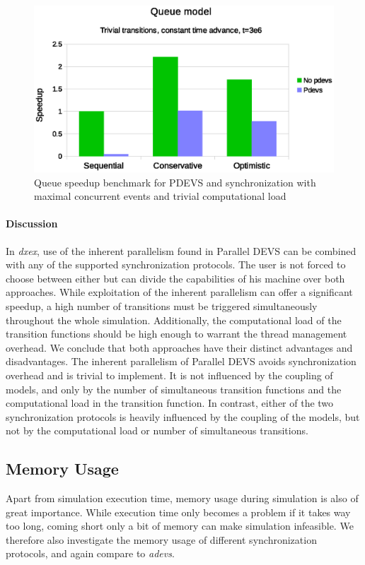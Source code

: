 \begin{figure}
	\center
	\includegraphics[width=\columnwidth]{fig/pdevs_no_sleep.eps}
	\caption{Queue speedup benchmark for PDEVS and synchronization with maximal concurrent events and trivial computational load}
	\label{fig:pdevs_plot_no_sleep}
\end{figure}

\paragraph{Discussion}
In \textit{dxex}, use of the inherent parallelism found in \textsf{Parallel DEVS} can be combined with any of the supported synchronization protocols.
The user is not forced to choose between either but can divide the capabilities of his machine over both approaches.
While exploitation of the inherent parallelism can offer a significant speedup, a high number of transitions must be triggered simultaneously throughout the whole simulation.
Additionally, the computational load of the transition functions should be high enough to warrant the thread management overhead.
We conclude that both approaches have their distinct advantages and disadvantages.
The inherent parallelism of \textsf{Parallel DEVS} avoids synchronization overhead and is trivial to implement.
It is not influenced by the coupling of models, and only by the number of simultaneous transition functions and the computational load in the transition function.
In contrast, either of the two synchronization protocols is heavily influenced by the coupling of the models, but not by the computational load or number of simultaneous transitions.

\subsection{Memory Usage}
Apart from simulation execution time, memory usage during simulation is also of great importance.
While execution time only becomes a problem if it takes way too long, coming short only a bit of memory can make simulation infeasible.
We therefore also investigate the memory usage of different synchronization protocols, and again compare to \textit{adevs}.

